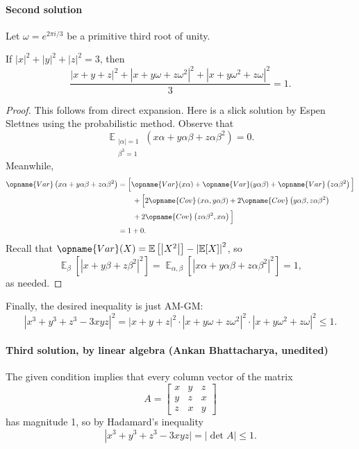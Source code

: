 \paragraph{Second solution} Let $\omega=e^{2\pi i/3}$ be a primitive third root of unity.
\begin{lemma*}
    If $|x|^2+|y|^2+|z|^2=3$, then \[\frac{\left\lvert x+y+z\right\rvert^2+\left\lvert x+y\omega+z\omega^2\right\rvert^2+\left\lvert x+y\omega^2+z\omega\right\rvert^2}3=1.\]
\end{lemma*}
\begin{proof}
    This follows from direct expansion. Here is a slick solution by Espen Slettnes using the probabilistic method. Observe that \[\mathop{\mathbb E}_{\substack{|\alpha|=1\\ \beta^3=1}}\left(x\alpha+y\alpha\beta+z\alpha\beta^2\right)=0.\]
    Meanwhile,
    \begin{align*}
        \opname{Var}\left(x\alpha+y\alpha\beta+z\alpha\beta^2\right)&=\Big[\opname{Var}(x\alpha)+\opname{Var}(y\alpha\beta)+\opname{Var}\left(z\alpha\beta^2\right)\Big]\\
        &\qquad+\Big[2\opname{Cov}\left(x\alpha,y\alpha\beta\right)+2\opname{Cov}\left(y\alpha\beta,z\alpha\beta^2\right)\\
        &\qquad+2\opname{Cov}\left(z\alpha\beta^2,x\alpha\right)\Big]\\
        &=1+0.
    \end{align*}
    Recall that $\opname{Var}(X)=\mathbb E\left[\left\lvert X^2\right\rvert\right]-\left\lvert\mathbb E[X]\right\rvert^2$, so \[\mathop{\mathbb E}_\beta\left[\left\lvert x+y\beta+z\beta^2\right\rvert^2\right]=\mathop{\mathbb E}_{\alpha,\beta}\left[\left\lvert x\alpha+y\alpha\beta+z\alpha\beta^2\right\rvert^2\right]=1,\]
    as needed.
\end{proof}

Finally, the desired inequality is just AM-GM: \[\left\lvert x^3+y^3+z^3-3xyz\right\rvert^2=\left\lvert x+y+z\right\rvert^2\cdot\left\lvert x+y\omega+z\omega^2\right\rvert^2\cdot\left\lvert x+y\omega^2+z\omega\right\rvert^2\le1.\]

\paragraph{Third solution, by linear algebra (Ankan Bhattacharya, unedited)} The given condition implies that every column vector of the matrix
\[
    A=\begin{bmatrix*}
        x&y&z\\
        y&z&x\\
        z&x&y
    \end{bmatrix*}
\]has magnitude 1, so by Hadamard's inequality
\[\left\lvert x^3+y^3+z^3-3xyz|=\left\lvert\det A\right\rvert\le1.\]


